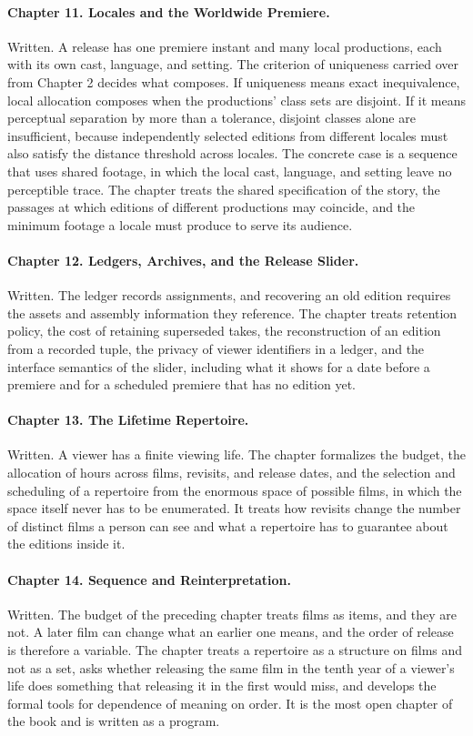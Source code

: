 \documentclass[11pt]{article}
\begin{document}
\paragraph{Chapter 11. Locales and the Worldwide Premiere.} Written. A release has one premiere instant and many local productions, each with its own cast, language, and setting. The criterion of uniqueness carried over from Chapter 2 decides what composes. If uniqueness means exact inequivalence, local allocation composes when the productions' class sets are disjoint. If it means perceptual separation by more than a tolerance, disjoint classes alone are insufficient, because independently selected editions from different locales must also satisfy the distance threshold across locales. The concrete case is a sequence that uses shared footage, in which the local cast, language, and setting leave no perceptible trace. The chapter treats the shared specification of the story, the passages at which editions of different productions may coincide, and the minimum footage a locale must produce to serve its audience.

\paragraph{Chapter 12. Ledgers, Archives, and the Release Slider.} Written. The ledger records assignments, and recovering an old edition requires the assets and assembly information they reference. The chapter treats retention policy, the cost of retaining superseded takes, the reconstruction of an edition from a recorded tuple, the privacy of viewer identifiers in a ledger, and the interface semantics of the slider, including what it shows for a date before a premiere and for a scheduled premiere that has no edition yet.

\paragraph{Chapter 13. The Lifetime Repertoire.} Written. A viewer has a finite viewing life. The chapter formalizes the budget, the allocation of hours across films, revisits, and release dates, and the selection and scheduling of a repertoire from the enormous space of possible films, in which the space itself never has to be enumerated. It treats how revisits change the number of distinct films a person can see and what a repertoire has to guarantee about the editions inside it.

\paragraph{Chapter 14. Sequence and Reinterpretation.} Written. The budget of the preceding chapter treats films as items, and they are not. A later film can change what an earlier one means, and the order of release is therefore a variable. The chapter treats a repertoire as a structure on films and not as a set, asks whether releasing the same film in the tenth year of a viewer's life does something that releasing it in the first would miss, and develops the formal tools for dependence of meaning on order. It is the most open chapter of the book and is written as a program.
\end{document}
